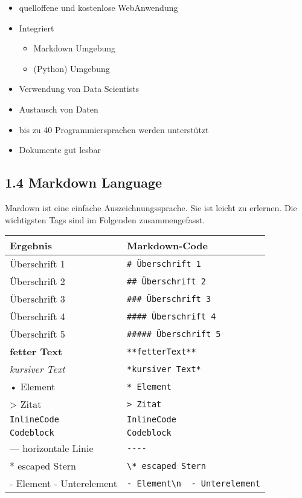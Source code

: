 \documentclass[
  11pt,
  a4paper,
  DIV=11,
  numbers=noendperiod]{scrartcl}
\providecommand{\tightlist}{%
  \setlength{\itemsep}{0pt}\setlength{\parskip}{0pt}}\usepackage{longtable,booktabs,array}
\begin{document}
\begin{itemize}
\tightlist
\item
  quelloffene und kostenlose WebAnwendung
\item
  Integriert

  \begin{itemize}
  \tightlist
  \item
    Markdown Umgebung
  \item
    (Python) Umgebung
  \end{itemize}
\item
  Verwendung von Data Scientists
\item
  Austausch von Daten
\item
  bis zu 40 Programmiersprachen werden unterstützt
\item
  Dokumente gut lesbar
\end{itemize}

\subsection{1.4 Markdown Language}\label{markdown-language}

Mardown ist eine einfache Auszeichnungssprache. Sie ist leicht zu
erlernen. Die wichtigsten Tags sind im Folgenden zusammengefasst.

\begin{longtable}[]{@{}ll@{}}
\toprule\noalign{}
Ergebnis & Markdown-Code \\
\midrule\noalign{}
\endhead
\bottomrule\noalign{}
\endlastfoot
Überschrift 1 & \texttt{\#\ Überschrift\ 1} \\
Überschrift 2 & \texttt{\#\#\ Überschrift\ 2} \\
Überschrift 3 & \texttt{\#\#\#\ Überschrift\ 3} \\
Überschrift 4 & \texttt{\#\#\#\#\ Überschrift\ 4} \\
Überschrift 5 & \texttt{\#\#\#\#\#\ Überschrift\ 5} \\
\textbf{fetter Text} & \texttt{**fetterText**} \\
\emph{kursiver Text} & \texttt{*kursiver\ Text*} \\
• Element & \texttt{*\ Element} \\
\textgreater{} Zitat & \texttt{\textgreater{}\ Zitat} \\
\texttt{InlineCode} &
\texttt{\textasciigrave{}InlineCode\textasciigrave{}} \\
\texttt{Codeblock} &
\texttt{\textasciigrave{}\textasciigrave{}\textasciigrave{}Codeblock\textasciigrave{}\textasciigrave{}\textasciigrave{}} \\
--- horizontale Linie & \texttt{-\/-\/-\/-} \\
* escaped Stern & \texttt{\textbackslash{}*\ escaped\ Stern} \\
- Element - Unterelement &
\texttt{-\ Element\textbackslash{}n\ \ -\ Unterelement} \\
\end{longtable}
\end{document}
